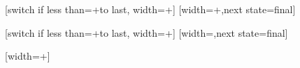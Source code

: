 %

{
  [switch if less than=+\pgfsnakesegmentlength to last,
                   width=+\pgfsnakesegmentlength]
  {
    \pgfpathmoveto{\pgfqpoint{0pt}{\pgfsnakesegmentamplitude}}
    \pgfpathlineto{\pgfqpoint{\pgfsnakesegmentobjectlength}{0pt}}
    \pgfpathlineto{\pgfqpoint{0pt}{-\pgfsnakesegmentamplitude}}
    \pgfpathclose
  }
  [width=+\pgfsnakesegmentobjectlength,next state=final]
  {
    \pgfpathmoveto{\pgfqpoint{0pt}{\pgfsnakesegmentamplitude}}
    \pgfpathlineto{\pgfqpoint{\pgfsnakesegmentobjectlength}{0pt}}
    \pgfpathlineto{\pgfqpoint{0pt}{-\pgfsnakesegmentamplitude}}
    \pgfpathclose
  }
  {
    \pgfpathmoveto{\pgfqpoint{\pgfsnakeremainingdistance}{0pt}}
  }
}



%

{
  [switch if less than=+\pgfsnakesegmentlength to last,
                   width=+\pgfsnakesegmentlength]
  {
    \pgfpathmoveto{\pgfqpoint{0pt}{\pgfsnakesegmentamplitude}}
    \pgfpathlineto{\pgfqpoint{\pgfsnakesegmentobjectlength}{-\pgfsnakesegmentamplitude}}
    \pgfpathmoveto{\pgfqpoint{0pt}{-\pgfsnakesegmentamplitude}}
    \pgfpathlineto{\pgfqpoint{\pgfsnakesegmentobjectlength}{\pgfsnakesegmentamplitude}}
  }
  [width=\pgfsnakesegmentobjectlength,next state=final]
  {
    \pgfpathmoveto{\pgfqpoint{0pt}{\pgfsnakesegmentamplitude}}
    \pgfpathlineto{\pgfqpoint{\pgfsnakesegmentobjectlength}{-1\pgfsnakesegmentamplitude}}
    \pgfpathmoveto{\pgfqpoint{0pt}{-\pgfsnakesegmentamplitude}}
    \pgfpathlineto{\pgfqpoint{\pgfsnakesegmentobjectlength}{\pgfsnakesegmentamplitude}}
  }
  {
    \pgfpathmoveto{\pgfqpoint{\pgfsnakeremainingdistance}{0pt}}
  }
}



%

{
  [width=+\pgfsnakesegmentlength]
  {
    \pgfpathmoveto{\pgfqpoint{0pt}{\pgfsnakesegmentamplitude}}
    \pgfpathlineto{\pgfqpoint{0pt}{-\pgfsnakesegmentamplitude}}
  }
  {
    \pgfpathmoveto{\pgfqpoint{0pt}{\pgfsnakesegmentamplitude}}
    \pgfpathlineto{\pgfqpoint{0pt}{-\pgfsnakesegmentamplitude}}
    \pgfpathmoveto{\pgfqpoint{\pgfsnakeremainingdistance}{0pt}}
  }
}


